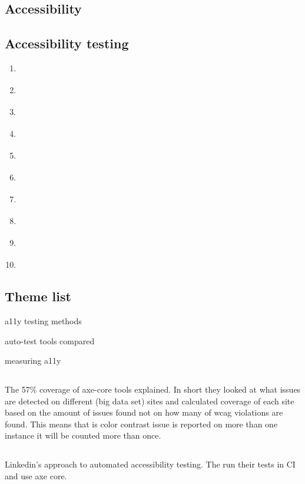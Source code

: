 \documentclass{master_thesis}
\begin{document}
\subsection*{Accessibility}
\subsection*{Accessibility testing}
\begin{enumerate}
	\item \cite{DequeSystems2021}
	\item \cite{AbouZahra2017}
	\item \cite{Sane2021}
	\item \cite{Thornton2022}
	\item \cite{RybinKoob2022}
	\item \cite{Ismailova2022}
	\item \cite{CampoverdeMolina2021}
	\item \cite{Kumar2020}
	\item \cite{Kumar2021}
	\item \cite{Seetha2022}
\end{enumerate}

\subsection*{Theme list}
\begin{list}{-}{}
	\item a11y testing methods
	\item auto-test tools compared
	\item measuring a11y
\end{list}

\subsection*{\cite{DequeSystems2021report}}
The 57\% coverage of axe-core tools explained. In short they looked at what issues are detected on different (big data set) sites and calculated coverage of each site based on the amount of issues found not on how many of \ac{wcag} violations are found. This means that is color contrast issue is reported on more than one instance it will be counted more than once.
\subsection*{\cite{Tse2020}}
Linkedin's approach to automated accessibility testing. The run their tests in CI and use axe core.
\end{document}
